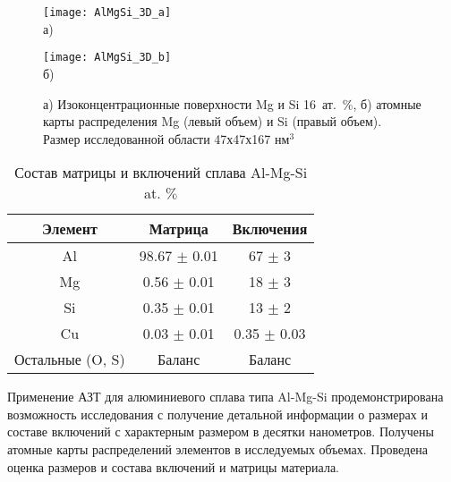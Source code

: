 \begin{figure}[htbp]
	\begin{minipage}[b][][b]{0.49\textwidth}\centering
		\texttt{[image: AlMgSi\_3D\_a]} \\ а)
	\end{minipage}
	\begin{minipage}[b][][b]{0.49\textwidth}\centering
		\texttt{[image: AlMgSi\_3D\_b]} \\ б)
	\end{minipage}
	\caption{а) Изоконцентрационные поверхности Mg и Si 16~ат.~$\%$, б) атомные карты распределения Mg (левый объем) и Si (правый объем). Размер исследованной области 47х47х167 нм$^3$}
	\label{fig:AlMgSi_3D}
\end{figure} 

\begin{table} [htbp]
	\centering
	\caption{Состав матрицы и включений сплава Al-Mg-Si at. $\%$}%
	\label{tab:AlMgSi_table}%
	\begin{SingleSpace}
		\begin{tabular}{| c | c | c |}
			\hline
			Элемент & Матрица & Включения \\ \hline
			Al & 98.67 $\pm$ 0.01 & 67 $\pm$ 3 \\ \hline
			Mg & 0.56 $\pm$ 0.01 & 18 $\pm$ 3 \\ \hline
			Si & 0.35 $\pm$ 0.01 & 13 $\pm$ 2 \\ \hline						
			Cu & 0.03 $\pm$ 0.01 & 0.35 $\pm$ 0.03\\ \hline
			Остальные (O, S) & Баланс & Баланс \\ \hline			
		\end{tabular}%
	\end{SingleSpace}
\end{table}

Применение АЗТ для алюминиевого сплава типа Al-Mg-Si продемонстрирована возможность исследования с получение детальной информации о размерах и составе включений с характерным размером в десятки нанометров. Получены атомные карты распределений элементов в исследуемых объемах. Проведена оценка размеров и состава включений и матрицы материала.

